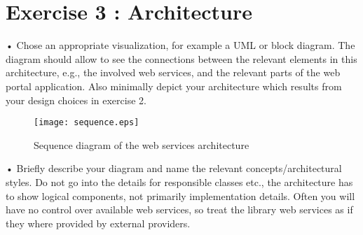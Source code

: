 \section{Exercise 3 : Architecture}

    • Chose an appropriate visualization, for example a UML or block diagram. The
    diagram should allow to see the connections between the relevant elements in this
    architecture, e.g., the involved web services, and the relevant parts of the web
    portal application. Also minimally depict your architecture which results from
    your design choices in exercise 2.

    \begin{figure}[p]
      \texttt{[image: sequence.eps]}
      \caption{\label{fig:before}Sequence diagram of the web services architecture}
    \end{figure}

    • Briefly describe your diagram and name the relevant concepts/architectural styles.
    Do not go into the details for responsible classes etc., the architecture has to show
    logical components, not primarily implementation details. Often you will have no
    control over available web services, so treat the library web services as if they where
    provided by external providers.
